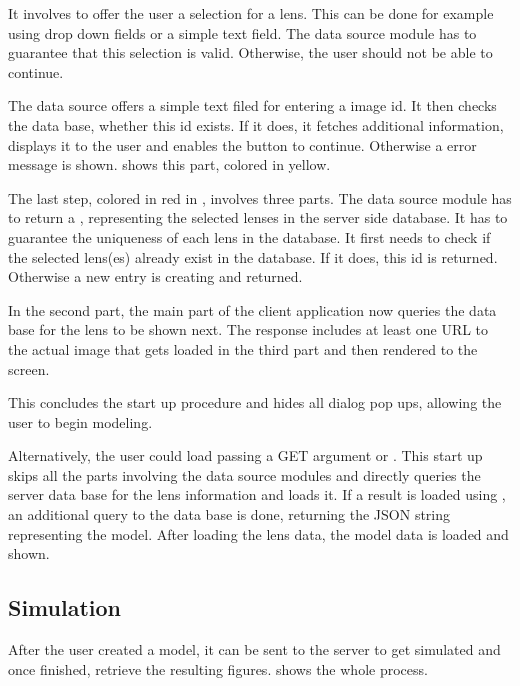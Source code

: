 

It involves to offer the user a selection for a lens.
This can be done for example using drop down fields or a simple text field.
The data source module has to guarantee that this selection is valid.
Otherwise, the user should not be able to continue.

The \sw data source offers a simple text filed for entering a \sw image id.
It then checks the \sw data base, whether this id exists.
If it does, it fetches additional information, displays it to the user and enables the button to continue.
Otherwise a error message is shown.
 shows this part, colored in yellow.

The last step, colored in red in , involves three parts.
The data source module has to return a , representing the selected lenses in the server side database.
It has to guarantee the uniqueness of each lens in the database.
It first needs to check if the selected lens(es) already exist in the database.
If it does, this id is returned. Otherwise a new entry is creating and returned.

In the second part, the main part of the client application now queries the data base for the lens to be shown next.
The response includes at least one URL to the actual image that gets loaded in the third part and then rendered to the screen.

This concludes the start up procedure and hides all dialog pop ups, allowing the user to begin modeling.

Alternatively, the user could load \spl passing a GET argument  or .
This start up skips all the parts involving the data source modules and directly queries the server data base for the lens information and loads it.
If a result is loaded using , an additional query to the data base is done, returning the JSON string representing the model.
After loading the lens data, the model data is loaded and shown.



\subsection{Simulation}

After the user created a model, it can be sent to the server to get simulated and once finished, retrieve the resulting figures.  shows the whole process.

